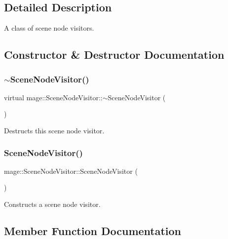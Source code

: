 \subsection{Detailed Description}
A class of scene node visitors. 

\subsection{Constructor \& Destructor Documentation}
\hypertarget{classmage_1_1_scene_node_visitor_ac45f02e28abeeb9220b0be954ca6a513}{}\label{classmage_1_1_scene_node_visitor_ac45f02e28abeeb9220b0be954ca6a513} 
\subsubsection{\texorpdfstring{$\sim$\+Scene\+Node\+Visitor()}{~SceneNodeVisitor()}}
{\footnotesize\ttfamily virtual mage\+::\+Scene\+Node\+Visitor\+::$\sim$\+Scene\+Node\+Visitor (\begin{DoxyParamCaption}{ }\end{DoxyParamCaption})\hspace{0.3cm}{\ttfamily [virtual]}}

Destructs this scene node visitor. \hypertarget{classmage_1_1_scene_node_visitor_a6a259a0ce19107bb644482b86c4bd27a}{}\label{classmage_1_1_scene_node_visitor_a6a259a0ce19107bb644482b86c4bd27a} 
\subsubsection{\texorpdfstring{Scene\+Node\+Visitor()}{SceneNodeVisitor()}}
{\footnotesize\ttfamily mage\+::\+Scene\+Node\+Visitor\+::\+Scene\+Node\+Visitor (\begin{DoxyParamCaption}{ }\end{DoxyParamCaption})\hspace{0.3cm}{\ttfamily [protected]}}

Constructs a scene node visitor. 

\subsection{Member Function Documentation}
\hypertarget{classmage_1_1_scene_node_visitor_a0f654e306f6d43d49081f319cd41812b}{}\label{classmage_1_1_scene_node_visitor_a0f654e306f6d43d49081f319cd41812b} 
